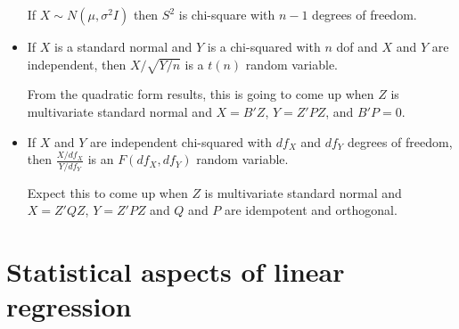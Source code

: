 \begin{itemize}[leftmargin=0pt]
  If $X \sim N(\mu, \sigma^2 I)$ then $S^2$ is chi-square with $n-1$ degrees of
  freedom.

\item %
  \begin{defn}
    If $X$ is a standard normal and $Y$ is a chi-squared with $n$ dof
    and $X$ and $Y$ are independent, then $X / \sqrt{Y/n}$ is a $t(n)$
    random variable.
  \end{defn}
  From the quadratic form results, this is going to come up when $Z$
  is multivariate standard normal and $X = B'Z$, $Y = Z'PZ$, and $B'P
  = 0$.

\item %
  \begin{defn}
    If $X$ and $Y$ are independent chi-squared with $df_X$ and $df_Y$
    degrees of freedom, then $\frac{X/df_X}{Y/df_Y}$ is an $F(df_X,
    df_Y)$ random variable.
  \end{defn}

  Expect this to come up when $Z$ is multivariate standard normal and
  $X = Z'QZ$, $Y = Z'PZ$ and $Q$ and $P$ are idempotent and orthogonal.

\end{itemize}

\section{Statistical aspects of linear regression}

